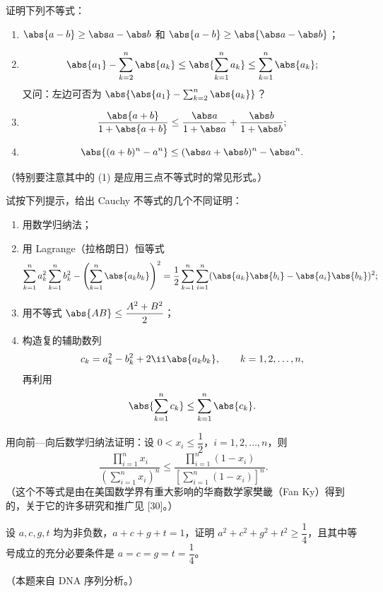 \begin{xexercise}[5]
证明下列不等式：
\begin{enumerate}[label=(\arabic*)]
  \item $\abs{a-b}\ge\abs a-\abs b$ 和 $\abs{a-b}\ge\abs{\abs a-\abs b}$；
  \item
  \[
    \abs{a_1}-\sum_{k=2}^n\abs{a_k}
    \le
    \abs{\sum_{k=1}^n a_k}
    \le
    \sum_{k=1}^n\abs{a_k};
  \]
  又问：左边可否为 $\abs{\abs{a_1}-\sum_{k=2}^n\abs{a_k}}$？
  \item
  \[
    \frac{\abs{a+b}}{1+\abs{a+b}}
    \le
    \frac{\abs a}{1+\abs a}+\frac{\abs b}{1+\abs b};
  \]
  \item
  \[
    \abs{(a+b)^n-a^n}\le(\abs a+\abs b)^n-\abs a^n.
  \]
\end{enumerate}
（特别要注意其中的 (1) 是应用三点不等式时的常见形式。）
\end{xexercise}

\begin{xexercise}[6]
试按下列提示，给出 Cauchy 不等式的几个不同证明：
\begin{enumerate}[label=(\arabic*)]
  \item 用数学归纳法；
  \item 用 Lagrange（拉格朗日）恒等式
  \[
    \sum_{k=1}^n a_k^2\sum_{k=1}^n b_k^2
    -\left(\sum_{k=1}^n\abs{a_kb_k}\right)^2
    =\frac12\sum_{k=1}^n\sum_{i=1}^n
    (\abs{a_k}\abs{b_i}-\abs{a_i}\abs{b_k})^2;
  \]
  \item 用不等式 $\abs{AB}\le\dfrac{A^2+B^2}{2}$；
  \item 构造复的辅助数列
  \[
    c_k=a_k^2-b_k^2+2\ii\abs{a_kb_k},\qquad k=1,2,\ldots,n,
  \]
  再利用
  \[
    \abs{\sum_{k=1}^n c_k}\le\sum_{k=1}^n\abs{c_k}.
  \]
\end{enumerate}
\end{xexercise}

\begin{xexercise}[7]
用向前—向后数学归纳法证明：设 $0<x_i\le\dfrac12$，$i=1,2,\ldots,n$，则
\[
  \frac{\displaystyle\prod_{i=1}^n x_i}
       {\left(\displaystyle\sum_{i=1}^n x_i\right)^n}
  \le
  \frac{\displaystyle\prod_{i=1}^n(1-x_i)}
       {\left[\displaystyle\sum_{i=1}^n(1-x_i)\right]^n}.
\]
（这个不等式是由在美国数学界有重大影响的华裔数学家樊畿（Fan Ky）得到的，关于它的许多研究和推广见 [30]。）
\end{xexercise}

\begin{xexercise}[8]
设 $a,c,g,t$ 均为非负数，$a+c+g+t=1$，证明 $a^2+c^2+g^2+t^2\ge\dfrac14$，且其中等号成立的充分必要条件是 $a=c=g=t=\dfrac14$。

（本题来自 DNA 序列分析。）
\end{xexercise}

